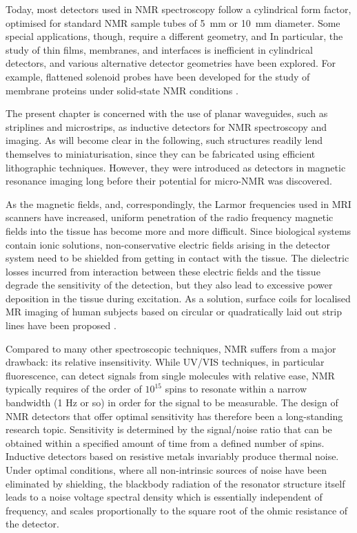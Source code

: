 Today, most detectors used in NMR spectroscopy follow a cylindrical form factor, optimised for standard NMR sample tubes of 5~mm or 10~mm diameter.
Some special
applications, though, require a different geometry, and  In particular, the study of thin films, 
membranes, and interfaces is inefficient in cylindrical detectors, and various
alternative detector geometries have been explored. For example, 
flattened solenoid 
probes have been developed for the study of membrane proteins under solid-state NMR conditions
\cite{Bechinger:1991in}. 

The present chapter is concerned with the use of planar waveguides, such as striplines
and microstrips, as inductive detectors for NMR spectroscopy and imaging. As 
will become clear in the following, such structures readily lend themselves
to miniaturisation, since they can be fabricated using efficient lithographic
techniques. However, they were introduced as detectors in magnetic 
resonance imaging long before their potential for micro-NMR was discovered.

As the magnetic fields, and, correspondingly, the Larmor frequencies used in MRI scanners 
have increased, uniform penetration of the radio frequency magnetic fields into the tissue has become 
more and more difficult. Since biological systems contain ionic solutions, non-conservative electric 
fields arising in the detector system need to be shielded from getting in contact with the tissue. The 
dielectric losses incurred from interaction between these electric fields and the tissue degrade the 
sensitivity of the detection, but they also lead to excessive power deposition in the tissue during 
excitation. As a solution, surface coils for localised MR imaging of human subjects based on circular 
or quadratically laid out strip lines have been proposed \cite{Zhang:2001js}.


Compared to many other spectroscopic techniques, NMR suffers from a major drawback: its relative 
insensitivity. While UV/VIS techniques, in particular fluorescence, can detect signals from single 
molecules with relative ease, NMR typically requires of the order of $10^{15}$ spins to resonate within a 
narrow bandwidth (1 Hz or so) in order for the signal to be measurable. 
The design of NMR detectors that offer optimal sensitivity has therefore been a long-standing research 
topic. Sensitivity is determined by the signal/noise ratio that can be obtained 
within a specified amount of time from a defined number of spins. Inductive detectors based on 
resistive metals invariably produce thermal noise. Under optimal conditions, where all non-intrinsic 
sources of noise have been eliminated by shielding, the blackbody radiation of the resonator structure 
itself leads to a noise voltage spectral density which is essentially independent of frequency, and 
scales proportionally to the square root of the ohmic resistance of the detector. 

